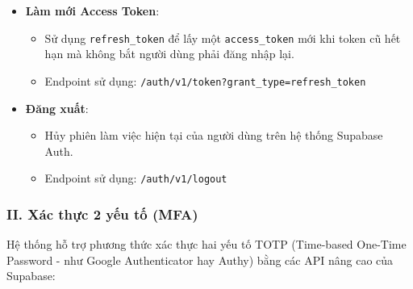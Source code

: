 \begin{itemize}
\item \textbf{Làm mới Access Token}:
\begin{itemize}
\item Sử dụng \texttt{refresh\_token} để lấy một \texttt{access\_token} mới khi token cũ hết hạn mà không bắt người dùng phải đăng nhập lại.
\item Endpoint sử dụng: \texttt{/auth/v1/token?grant\_type=refresh\_token}
\end{itemize}

\item \textbf{Đăng xuất}:
\begin{itemize}
\item Hủy phiên làm việc hiện tại của người dùng trên hệ thống Supabase Auth.
\item Endpoint sử dụng: \texttt{/auth/v1/logout}
\end{itemize}
\end{itemize}

\subsubsection{II. Xác thực 2 yếu tố (MFA)}

Hệ thống hỗ trợ phương thức xác thực hai yếu tố TOTP (Time-based One-Time Password - như Google Authenticator hay Authy) bằng các API nâng cao của Supabase:

